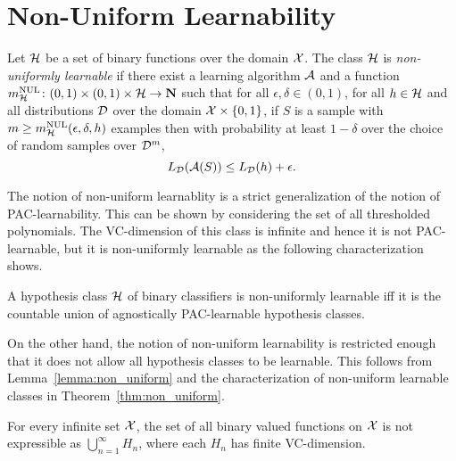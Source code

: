 \chapter{Non-Uniform Learnability}

Let $\mathcal{H}$ be a set of binary functions over the domain $\mathcal{X}$.  The class
$\mathcal{H}$ is \emph{non-uniformly learnable} if there exist a learning
algorithm $\mathcal{A}$ and a function $m_{\mathcal{H}}^{\text{NUL}} \colon (0, 1) \times (0, 1)
\times \mathcal{H} \rightarrow \mathbf{N}$ such that for all $\epsilon, \delta \in (0,
1)$, for all $h \in \mathcal{H}$ and all distributions $\mathcal{D}$ over the domain
$\mathcal{X} \times \{0, 1\}$, if $S$ is a sample with $m \geq m_{\mathcal{H}}^{\text{NUL}}(\epsilon,
\delta, h)$ examples then with probability at least $1 - \delta$ over the choice of
random samples over $\mathcal{D}^m$, 
\[
    L_{\mathcal{D}}(\mathcal{A} (S)) \leq L_{\mathcal{D}} (h) + \epsilon.
\]

The notion of non-uniform learnablity is a strict generalization of the notion of 
PAC-learnability. This can be shown by considering the set of all thresholded 
polynomials. The VC-dimension of this class is infinite and hence it is not PAC-learnable, but 
it is non-uniformly learnable as the following characterization shows.

\begin{theorem} \label{thm:non_uniform}
A hypothesis class $\mathcal{H}$ of binary classifiers is non-uniformly learnable iff it 
is the countable union of agnostically PAC-learnable hypothesis classes.
\end{theorem}

On the other hand, the notion of non-uniform learnability is restricted enough
that it does not allow all hypothesis classes to be learnable. This follows
from Lemma~\ref{lemma:non_uniform} and the characterization of non-uniform
learnable classes in Theorem~\ref{thm:non_uniform}. 

\begin{lemma}\label{lemma:non_uniform}
For every infinite set $\mathcal{X}$, the set of all binary valued functions on $\mathcal{X}$ is
not expressible as $\bigcup_{n = 1}^{\infty} H_n$, where each $H_n$ has finite VC-dimension.
\end{lemma}

